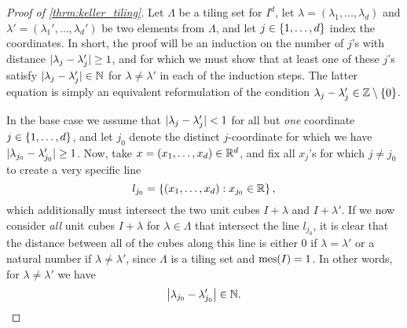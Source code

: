\documentclass[../thesis.tex]{subfiles}
\begin{document}
\begin{proof}[Proof of \cref{thrm:keller_tiling}]
    Let $\Lambda$ be a tiling set for $I^d$, let $\lambda = (\lambda_1,\dots,\lambda_d)$ and $\lambda' = (\lambda_1',\dots,\lambda_d')$ be two elements from $\Lambda$, and let $j\in\{1,\dots, d\}$ index the coordinates. In short, the proof will be an induction on the number of $j$'s with distance $|\lambda_j-\lambda_j'|\geq 1$, and for which we must show that at least one of these $j$'s satisfy $|\lambda_{j}-\lambda_{j}'| \in \mathbb{N}$ for $\lambda \neq \lambda'$ in each of the induction steps. The latter equation is simply an equivalent reformulation of the condition $\lambda_{j}-\lambda_{j}' \in \mathbb{Z}\setminus\{0\}$.

    In the base case we assume that $|\lambda_j-\lambda_j' |< 1 $ for all but \emph{one} coordinate $j\in \{1,\dots,d\}$, and let $j_0$ denote the distinct $j$-coordinate for which we have $|\lambda_{j_0}-\lambda_{j_0}'| \geq 1$. Now, take $x=(x_1,\dots,x_d)\in \mathbb{R}^d$, and fix all $x_j$'s for which $j\neq j_0$ to create a very specific line
    \begin{equation*}
        l_{j_0} = \left\{\left(x_1,\dots,x_d\right) : x_{j_0} \in \mathbb{R} \right\},
    \end{equation*}
    which additionally must intersect the two unit cubes $I+\lambda$ and $I+\lambda'$. If we now consider \emph{all} unit cubes $I+\lambda$ for $\lambda \in \Lambda$ that intersect the line $l_{j_0}$, it is clear that the distance between all of the cubes along this line is either $0$ if $\lambda=\lambda'$ or a natural number if $\lambda \neq \lambda'$, since $\Lambda$ is a tiling set and $\operatorname{mes}(I)=1$. In other words, for $\lambda \neq \lambda'$ we have
    \begin{equation*}
        \left|\lambda_{j_0}-\lambda_{j_0}'\right| \in \mathbb{N}.
    \end{equation*}


\end{proof}
\end{document}
